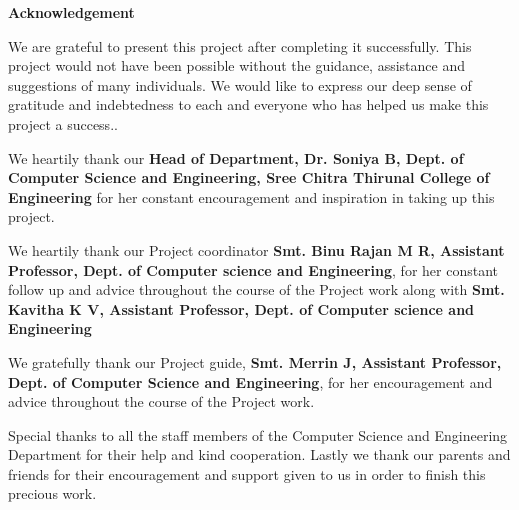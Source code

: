 \documentclass[a4paper,12pt,oneside]{report}
\begin{document}


\newpage
\thispagestyle{empty}
 \begin{center} {\Large \bf Acknowledgement}\end{center}
 \par
 We are grateful to present this project after completing it successfully. This project would not
have been possible without the guidance, assistance and suggestions of many individuals. We
would like to express our deep sense of gratitude and indebtedness to each and everyone who
has helped us make this project a success.. 
\par
We heartily thank our  {\textbf {Head of Department, Dr. Soniya B, Dept. of Computer Science and
Engineering, Sree Chitra Thirunal College of Engineering }}for her constant
encouragement and inspiration in taking up this project.
\par
We heartily thank our Project coordinator {\textbf {Smt. Binu Rajan M R, Assistant Professor, Dept. of
Computer science and Engineering}}, for her constant follow up and advice throughout the
course of the Project work along with {\textbf {Smt. Kavitha K V, Assistant Professor, Dept. of
Computer science and Engineering}}
\par
We gratefully thank our Project guide, {\textbf {Smt. Merrin J, Assistant Professor, Dept. of
Computer Science and Engineering}}, for her encouragement and advice throughout the
course of the Project work.
\par
Special thanks to all the staff members of the Computer Science and Engineering Department
for their help and kind cooperation.
Lastly we thank our parents and friends for their encouragement and support given to us in
order to finish this precious work.

 \noindent 
 \par
	
 \newpage
	
\end{document}
